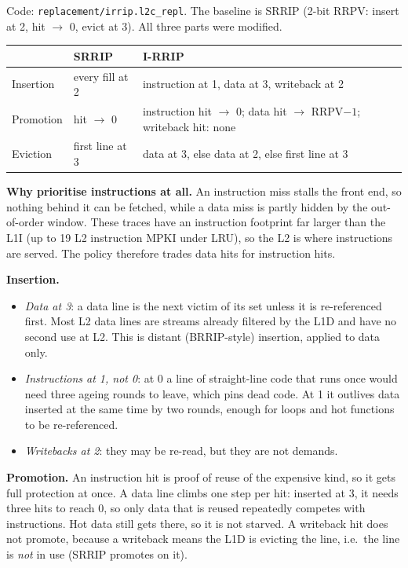 \documentclass[12pt]{report}
\newcommand{\cfg}[1]{\texttt{#1}}
\begin{document}
Code: \cfg{replacement/irrip.l2c\_repl}. The baseline is SRRIP (2-bit RRPV:
insert at 2, hit $\to$ 0, evict at 3). All three parts were modified.

\begin{table}[H]\centering
\begin{tabular}{l l l}
\toprule
 & SRRIP & I-RRIP \\
\midrule
Insertion & every fill at 2 & instruction at 1, data at 3, writeback at 2\\
Promotion & hit $\to$ 0 & instruction hit $\to$ 0; data hit $\to$ RRPV$-1$; writeback hit: none\\
Eviction & first line at 3 & data at 3, else data at 2, else first line at 3\\
\bottomrule
\end{tabular}
\end{table}

\textbf{Why prioritise instructions at all.} An instruction miss stalls the
front end, so nothing behind it can be fetched, while a data miss is partly
hidden by the out-of-order window. These traces have an instruction
footprint far larger than the L1I (up to 19 L2 instruction MPKI under LRU),
so the L2 is where instructions are served. The policy therefore trades data
hits for instruction hits.

\textbf{Insertion.}
\begin{itemize}[nosep]
\item \emph{Data at 3}: a data line is the next victim of its set unless it is
  re-referenced first. Most L2 data lines are streams already filtered by the
  L1D and have no second use at L2. This is distant (BRRIP-style) insertion,
  applied to data only.
\item \emph{Instructions at 1, not 0}: at 0 a line of straight-line code that
  runs once would need three ageing rounds to leave, which pins dead code. At
  1 it outlives data inserted at the same time by two rounds, enough for
  loops and hot functions to be re-referenced.
\item \emph{Writebacks at 2}: they may be re-read, but they are not demands.
\end{itemize}

\textbf{Promotion.} An instruction hit is proof of reuse of the expensive
kind, so it gets full protection at once. A data line climbs one step per hit:
inserted at 3, it needs three hits to reach 0, so only data that is reused
repeatedly competes with instructions. Hot data still gets there, so it is
not starved. A writeback hit does not promote, because a writeback means the
L1D is evicting the line, i.e.\ the line is \emph{not} in use (SRRIP promotes
on it).
\end{document}
